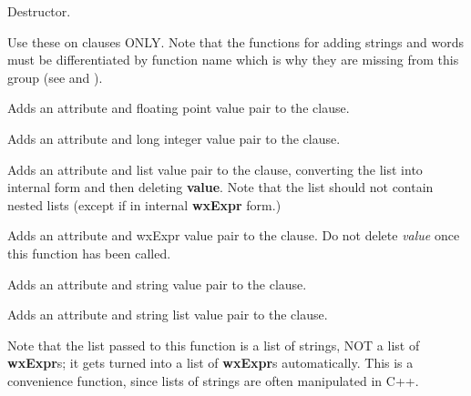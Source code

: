 
Destructor.

\label{wxexpraddattributevalue}

Use these on clauses ONLY. Note that the functions for adding strings
and words must be differentiated by function name which is why
they are missing from this group (see  and
\rtfsp{}).


Adds an attribute and floating point value pair to the clause.


Adds an attribute and long integer value pair to the clause.


Adds an attribute and list value pair to the clause, converting the list into
internal form and then deleting {\bf value}. Note that the list should not contain
nested lists (except if in internal {\bf wxExpr} form.)


Adds an attribute and wxExpr value pair to the clause. Do not delete\rtfsp
{\it value} once this function has been called.

\label{wxexpraddattributevaluestring}


Adds an attribute and string value pair to the clause.

\label{wxexpraddattributevaluestringlist}


Adds an attribute and string list value pair to the clause.

Note that the list passed to this function is a list of strings, NOT a list
of {\bf wxExpr}s; it gets turned into a list of {\bf wxExpr}s
automatically. This is a convenience function, since lists of strings
are often manipulated in C++.


